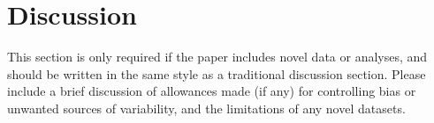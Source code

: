 \section*{Discussion} %
This section is only required if the paper includes novel data or analyses, and should be written in the same style as a traditional discussion section.
Please include a brief discussion of allowances made (if any) for controlling bias or unwanted sources of variability, and the limitations of any novel datasets.

